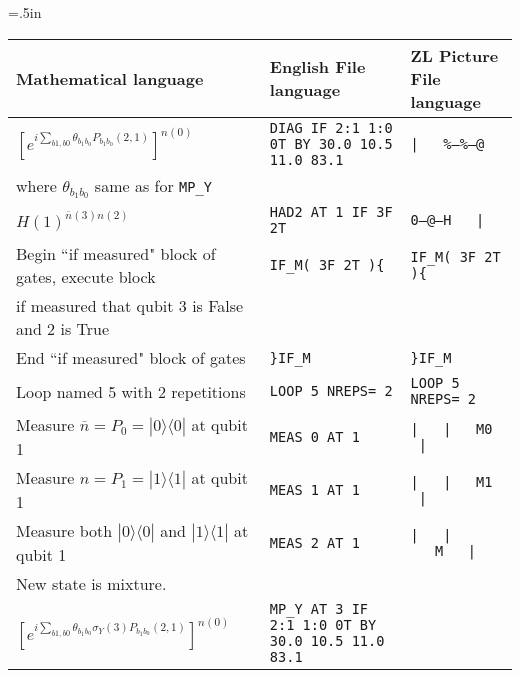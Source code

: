 \documentclass[10pt]{article}
\begin{document}

\renewcommand{\arraystretch}{1.3}

\paperheight=11in
\topmargin=0in
\headheight=0in
\headsep=0in
\topskip=0in
\textheight=11in
\footskip 0in

\paperwidth=8.5in
\oddsidemargin=0in
\evensidemargin=0in
\textwidth=8.0in
\parindent=.5in

\newcommand{\sigx}[0]{{ \sigma_X} }
\newcommand{\sigy}[0]{{ \sigma_Y} }
\newcommand{\sigz}[0]{{ \sigma_Z} }
\newcommand{\nbar}[0]{{ \overline{n} } }

\newcommand{\bra}[1]{\langle#1|}
\newcommand{\ket}[1]{|#1\rangle}

\begin{center}
\begin{tabular}{|l|l|l|}
\hline
Mathematical language & English File language&
ZL Picture File language\\
\hline
\hline
$[e^{i\sum_{b1,b0}\theta_{b_1b_0}P_{b_1b_0}(2,1)}]^{n(0)}$
&
\scriptsize{{\tt DIAG IF 2:1 1:0 0T BY 30.0 10.5 11.0 83.1}}
&{\tt |\ \ \ \%---\%---@}
\\
where $\theta_{b_1b_0}$ same as for {\tt MP\_Y}
&&
\\
\hline
$H(1)^{\nbar(3)n(2)}$ &
{\tt  HAD2  AT  1  IF  3F  2T}&{\tt 0---@---H\ \ \ |}
\\
\hline
\footnotesize{Begin ``if measured"
block of gates, execute block}
& {\tt IF\_M( 3F 2T )\{} & {\tt IF\_M( 3F 2T )\{}
\\
\footnotesize{if measured
that qubit 3 is False and 2 is True} &&
\\
\hline
End ``if measured" block of gates&
{\tt  \}IF\_M} &{\tt  \}IF\_M }
\\
\hline
Loop named 5 with 2 repetitions &
{\tt  LOOP 5 NREPS= 2}&{\tt  LOOP 5 NREPS= 2}
\\
\hline
Measure $\overline{n}=P_0=\ket{0}\bra{0}$ at qubit 1  &
{\tt  MEAS 0 AT 1 }&{\tt |\ \ \ |\ \ \ M0 \  |}
\\
\hline
Measure $n=P_1=\ket{1}\bra{1}$ at qubit 1  &
{\tt  MEAS 1 AT 1 }&{\tt |\ \ \ |\ \ \ M1 \  |}
\\
\hline
Measure both $\ket{0}\bra{0}$
and $\ket{1}\bra{1}$ at qubit 1  &
{\tt  MEAS 2 AT 1 }&{\tt |\ \ \ |\ \ \ M\ \ \ |}\\
New state is mixture. &&
\\
\hline
$[e^{i\sum_{b1,b0}\theta_{b_1b_0}\sigy(3)P_{b_1b_0}(2,1)}]^{n(0)}$
&\scriptsize{
{\tt MP\_Y  AT  3 IF 2:1 1:0 0T BY 30.0 10.5 11.0 83.1}}

\end{tabular}
\end{center}
\end{document}
